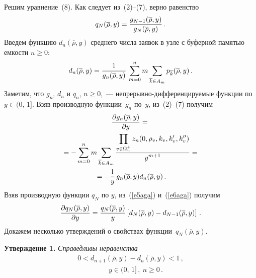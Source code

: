 \begin{multicols}{2}
    Решим уравнение~(8). Как следует из~(2)--(7), верно 
равенство
\begin{equation}
q_N(\overline{\rho},y) = \displaystyle\frac{\displaystyle g_{N-1}(\overline{\rho},y )\mathstrut}{\displaystyle g_N(\overline{\rho},y)\mathstrut}\,.
\label{e5aga}
\end{equation}
Введем функцию  $d_n(\overline{\rho} ,y)$ среднего числа заявок в узле с 
буферной памятью емкости $n\geq 0$:
$$
d_n(\overline{\rho} ,y) = 
\displaystyle\frac{\displaystyle 1\mathstrut}{\displaystyle g_n(\overline{\rho},y)\mathstrut}\,\sum\limits_{m=0}^n m\sum\limits_{\overline{k}\in 
A_m} p_{\overline{k}}(\overline{\rho},y)\,.
$$
Заметим, что $g_n$, $d_n$ и $q_n$, 
$n\geq 0$,~--- непрерывно-дифференцируемые функции по $y\in (0,\,1]$. Взяв 
производную функции~$g_n$ по~$y$, из~(2)--(7) получим
\begin{multline}
\displaystyle\frac{\displaystyle \partial g_n(\overline{\rho},y)\mathstrut}{\displaystyle \partial y\mathstrut} ={}\\
{}= -\sum\limits_{m=0}^n m 
\sum\limits_{\overline{k}\in A_m}\displaystyle\frac{\displaystyle \prod\limits_{v\in\Omega_u^+} z_n 
(0,\rho_v, k_v, k_v^\prime , k_v^{\prime\prime})\mathstrut}{\displaystyle y^{m+1}\mathstrut}={}\\
{}= -\displaystyle\frac{\displaystyle 1\mathstrut}{\displaystyle y\mathstrut}\,g_n (\overline{\rho},y)d_n(\overline{\rho},y)\,.
\label{e6aga}
\end{multline}
Взяв производную функции $q_N$ по $y$, из~(\ref{e5aga}) и~(\ref{e6aga}) 
получим
\begin{equation}
\displaystyle\frac{\displaystyle \partial q_N(\overline{\rho},y)\mathstrut}{\displaystyle \partial y\mathstrut} = \displaystyle\frac{\displaystyle q_N(\overline{\rho},y)\mathstrut}{\displaystyle y\mathstrut}\left 
[ d_N (\overline{\rho},y)-d_{N-1}(\overline{\rho},y)\right ]\,.
\label{e7aga}
\end{equation}
    Докажем несколько утверждений о свойствах 
функции~$q_N(\overline{\rho},y)$.
\medskip

\noindent
\textbf{Утверждение 1.} \textit{Справедливы неравенства}
\begin{multline}
0<d_{n+1}(\overline{\rho},y)-d_n(\overline{\rho},y) <1\,,\\
\ \ \ \ \ \ \ \ \ \ \ \ \ \ \ \ \ \ \ \ y\in (0,\,1]\,, \ n\geq 0\,.
\label{e8aga}
\end{multline}


\noindent


\end{multicols}
